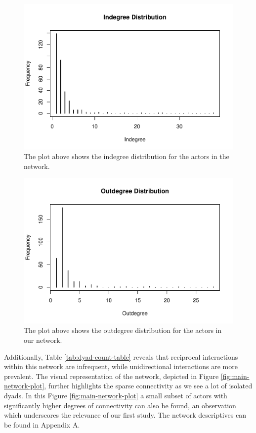 \documentclass[
  man,floatsintext]{apa6}
\begin{document}
\begin{figure}[!h]

{\centering \includegraphics[width=0.5\linewidth,]{SNA4DS_Report_files/figure-latex/degree-in-1} 

}

\caption{The plot above shows the indegree distribution for the actors in the network.}\label{fig:degree-in}
\end{figure}



\begin{figure}[!h]

{\centering \includegraphics[width=0.5\linewidth,]{SNA4DS_Report_files/figure-latex/degree-out-1} 

}

\caption{The plot above shows the outdegree distribution for the actors in our network.}\label{fig:degree-out}
\end{figure}
\newpage

Additionally, Table \ref{tab:dyad-count-table} reveals that reciprocal interactions within this network are infrequent, while unidirectional interactions are more prevalent. The visual representation of the network, depicted in Figure \ref{fig:main-network-plot}, further highlights the sparse connectivity as we see a lot of isolated dyads. In this Figure \ref{fig:main-network-plot} a small subset of actors with significantly higher degrees of connectivity can also be found, an observation which underscores the relevance of our first study. The network descriptives can be found in Appendix A.\\
\strut \\
\end{document}
